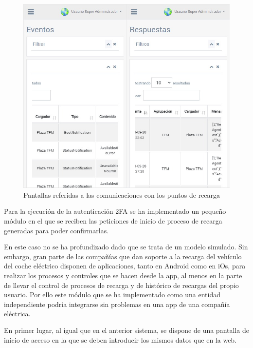 \documentclass[12pt,a4paper,onecolumn,oneside]{report}
\begin{document}
\begin{figure}[H] 
\centering
  \includegraphics[width=1\textwidth]{figuras/design5.png}
  \caption[Pantallas referidas a las comunicaciones con los puntos de recarga]{Pantallas referidas a las comunicaciones con los puntos de recarga\\
  }
  \label{fig:design5}
\end{figure}

Para la ejecución de la autenticación 2FA se ha implementado un pequeño módulo en el que se reciben las peticiones de inicio de proceso de recarga generadas para poder confirmarlas. 

En este caso no se ha profundizado dado que se trata de un modelo simulado. Sin embargo, gran parte de las compañías que dan soporte a la recarga del vehículo del coche eléctrico disponen de aplicaciones, tanto en Android como en iOs, para realizar los procesos y controles que se hacen desde la app, al menos en la parte de llevar el control de procesos de recarga y de histórico de recargas del propio usuario. Por ello este módulo que se ha implementado como una entidad independiente podría integrarse sin problemas en una app de una compañía eléctrica.

En primer lugar, al igual que en el anterior sistema, se dispone de una pantalla de inicio de acceso en la que se deben introducir los mismos datos que en la web.
\end{document}
